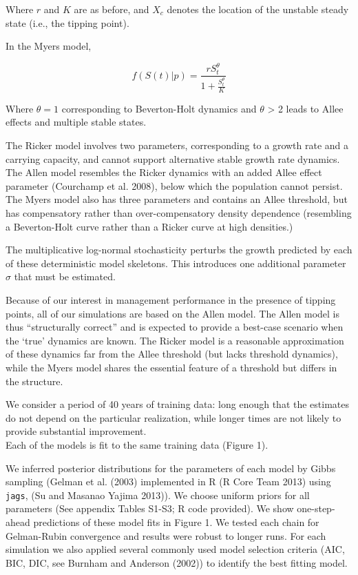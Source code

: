 \documentclass[author-year, 12pt,review]{components/elsarticle} %
\begin{document}
Where $r$ and $K$ are as before, and $X_c$ denotes the location of the
unstable steady state (i.e., the tipping point).

In the Myers model,

\begin{equation}
f(S(t) | p)  = \frac{r S_t^{\theta}}{1 + \frac{S_t^\theta}{K}} \label{myers}
\end{equation}

Where $\theta = 1$ corresponding to Beverton-Holt dynamics and $\theta$
\textgreater{} 2 leads to Allee effects and multiple stable states.

The Ricker model involves two parameters, corresponding to a growth rate
and a carrying capacity, and cannot support alternative stable growth
rate dynamics. The Allen model resembles the Ricker dynamics with an
added Allee effect parameter (Courchamp et al. 2008), below which the
population cannot persist. The Myers model also has three parameters and
contains an Allee threshold, but has compensatory rather than
over-compensatory density dependence (resembling a Beverton-Holt curve
rather than a Ricker curve at high densities.)

The multiplicative log-normal stochasticity perturbs the growth
predicted by each of these deterministic model skeletons. This
introduces one additional parameter $\sigma$ that must be estimated.

Because of our interest in management performance in the presence of
tipping points, all of our simulations are based on the Allen model. The
Allen model is thus ``structurally correct'' and is expected to provide
a best-case scenario when the `true' dynamics are known. The Ricker
model is a reasonable approximation of these dynamics far from the Allee
threshold (but lacks threshold dynamics), while the Myers model shares
the essential feature of a threshold but differs in the structure.

We consider a period of 40 years of training data: long enough that the
estimates do not depend on the particular realization, while longer
times are not likely to provide substantial improvement.\\Each of the
models is fit to the same training data (Figure 1).

We inferred posterior distributions for the parameters of each model by
Gibbs sampling (Gelman et al. (2003) implemented in R (R Core Team 2013)
using \texttt{jags}, (Su and Masanao Yajima 2013)). We choose uniform
priors for all parameters (See appendix Tables S1-S3; R code provided).
We show one-step-ahead predictions of these model fits in Figure 1. We
tested each chain for Gelman-Rubin convergence and results were robust
to longer runs. For each simulation we also applied several commonly
used model selection criteria (AIC, BIC, DIC, see Burnham and Anderson
(2002)) to identify the best fitting model.
\end{document}
